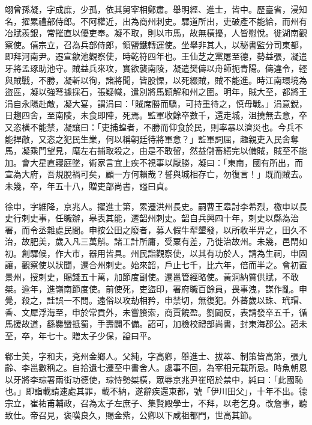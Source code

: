 \begin{pinyinscope}
 翊曾孫凝，字成庶，少孤，依其舅宰相鄭肅。舉明經、進士，皆中。歷臺省，浸知名，擢累禮部侍郎。不阿權近，出為商州刺史。驛道所出，吏破產不能給，而州有冶賦羨銀，常摧直以優吏奉。凝不取，則以市馬，故無橫擾，人皆慰悅。徙湖南觀察使。僖宗立，召為兵部侍郎，領鹽鐵轉運使。坐舉非其人，以秘書監分司東都，即拜河南尹。遷宣歙池觀察使，時乾符四年也。王仙芝之黨屠至德，勢益張，凝遣牙將孟琢助池守。賊益兵來攻，實欲襲南陵，凝遣樊儔以舟師扼青陽。儔違令，輕與賊戰，不勝，凝斬以徇，諸將聞，皆股慄，以死綴賊，賊不能進。時江南環境為盜區，凝以強弩據採石，張疑幟，遣別將馬穎解和州之圍。明年，賊大至，都將王涓自永陽赴敵，凝大宴，謂涓曰：「賊席勝而驕，可持重待之，慎毋戰。」涓意銳，日趨四舍，至南陵，未食即陣，死焉。監軍收餘卒數千，還走城，沮撓無去意，卒又恣橫不能禁，凝讓曰：「吏捕蝗者，不勝而仰食於民，則率暴以濟災也。今兵不能捍敵，又恣之犯民生業，何以稱朝廷待將軍意？」監軍詞屈，趣親吏入民舍奪馬，凝乘門望見，麾左右捕取殺之，由是不敢留，然益儲畜繕完以備賊，賊至不能加。會大星直寢庭墜，術家言宜上疾不視事以厭勝，凝曰：「東南，國有所出，而宣為大府，吾規脫禍可矣，顧一方何賴哉？誓與城相存亡，勿復言！」既而賊去。未幾，卒，年五十八，贈吏部尚書，謚曰貞。



 徐申，字維降，京兆人。擢進士第，累遷洪州長史。嗣曹王皋討李希烈，檄申以長史行刺史事，任職辦，皋表其能，遷韶州刺史。韶自兵興四十年，刺史以縣為治署，而令丞雜處民間。申按公田之廢者，募人假牛犁墾發，以所收半畀之，田久不治，故肥美，歲入凡三萬斛。諸工計所庸，受粟有差，乃徙治故州。未幾，邑閈如初。創驛候，作大市，器用皆具。州民詣觀察使，以其有功於人，請為生祠，申固讓，觀察使以狀聞，遷合州刺史。始來韶，戶止七千，比六年，倍而半之。會初置景州，授刺史，賜錢五十萬，加節度副使。遷邕管經略使。黃洞納質供賦，不敢桀。逾年，進嶺南節度使。前使死，吏盜印，署府職百餘員，畏事洩，謀作亂。申覺，殺之，詿誤一不問。遠俗以攻劫相矜，申禁切，無復犯。外蕃歲以珠、玳瑁、香、文犀浮海至，申於常貢外，未嘗賸索，商賈饒盈。劉闢反，表請發卒五千，循馬援故道，繇爨蠻抵蜀，手壽闢不備。詔可，加檢校禮部尚書，封東海郡公。詔未至，卒，年七十。贈太子少保，謚曰平。



 郗士美，字和夫，兗州金鄉人。父純，字高卿，舉進士、拔萃、制策皆高第，張九齡、李邕數稱之。自拾遺七遷至中書舍人。處事不回，為宰相元載所忌。時魚朝恩以牙將李琮署兩街功德使，琮恃勢桀橫，眾辱京兆尹崔昭於禁中，純曰：「此國恥也。」即詣載請速處其罪，載不納，遂辭疾還東都，號「伊川田父」，十年不出。德宗立，崔祐甫輔政，召為太子左庶子、集賢殿學士，不拜，以老乞身。改詹事，聽致仕。帝召見，褒嘆良久，賜金紫，公卿以下咸祖都門，世高其節。




\end{pinyinscope}
